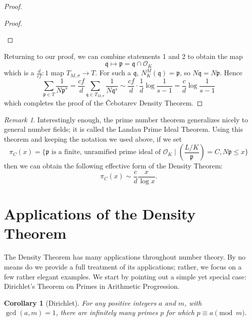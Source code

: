 \documentclass{article}
\theoremstyle{plain}
\newtheorem{cor}[thm]{Corollary}
\theoremstyle{definition}
\theoremstyle{remark}
\newtheorem{rem}[thm]{Remark}
\numberwithin{equation}{section}
\numberwithin{thm}{section}
\begin{document}
\begin{proof}
\begin{proof}
\begin{enumerate}
\end{enumerate}

\end{proof}

Returning to our proof, we can combine statements 1 and 2 to obtain the map $$\mathfrak{q} \mapsto \mathfrak{p} = \mathfrak{q} \cap \mathcal{O}_K$$ which is a $\frac{d}{cf} : 1$ map $T_{M, \sigma} \to T$. For such a $\mathfrak{q}$, $N_{K}^{M}(\mathfrak{q}) = \mathfrak{p}$, so $N\mathfrak{q} = N\mathfrak{p}$. Hence $$\sum_{\mathfrak{p} \in T} \frac{1}{N\mathfrak{p}^{s}} = \frac{cf}{d} \sum_{\mathfrak{q} \in T_{M, \sigma}} \frac{1}{N\mathfrak{q}^{s}} \sim \frac{cf}{d} \cdot \frac{1}{d} \log\frac{1}{s-1} = \frac{c}{d} \log\frac{1}{s-1}$$ which completes the proof of the Čebotarev Density Theorem. 
\end{proof}

\begin{rem}
Interestingly enough, the prime number theorem generalizes nicely to general number fields; it is called the Landau Prime Ideal Theorem. Using this theorem and keeping the notation we used above, if we set $$\pi_{C}(x) = \{\mathfrak{p} \text{ is a finite, unramified prime ideal of } \mathcal{O}_{K} \mid \left(\frac{L/K}{\mathfrak{p}}\right) = C, N\mathfrak{p} \leq x\}$$ then we can obtain the following effective form of the Density Theorem: $$\pi_{C}(x) \sim \frac{c}{d} \frac{x}{\log x}.$$
\end{rem}

\section{Applications of the Density Theorem}

The Density Theorem has many applications throughout number theory. By no means do we provide a full treatment of its applications; rather, we focus on a few rather elegant examples. We start by pointing out a simple yet special case: Dirichlet's Theorem on Primes in Arithmetic Progression. 

\begin{cor}[Dirichlet]
For any positive integers $a$ and $m$, with $\gcd(a, m) = 1$, there are infinitely many primes $p$ for which $p \equiv a \pmod{m}$. 
\end{cor}
\end{document}
